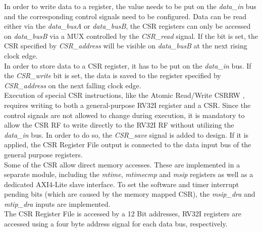 In order to write data to a register, the value needs to be put on the \textit{data\_in} bus and the corresponding control signals need to be configured. Data can be read either via the \textit{data\_busA} or \textit{data\_busB}, the CSR registers can only be accessed on \textit{data\_busB} via a MUX controlled by the \textit{CSR\_read} signal. If the bit is set, the CSR specified by \textit{CSR\_address} will be visible on \textit{data\_busB} at the next rising clock edge.\\
In order to store data to a CSR register, it has to be put on the \textit{data\_in} bus. If the \textit{CSR\_write} bit is set, the data is saved to the register specified by \textit{CSR\_address} on the next falling clock edge.\\
Execution of special \ac{CSR} instructions, like the Atomic Read/Write CSRRW \cite{riscv:unprivileged}, requires writing to both a general-purpose RV32I register and a \ac{CSR}. Since the control signals are not allowed to change during execution, it is mandatory to allow the \ac{CSR} \ac{RF} to write directly to the \ac{RV32I} \ac{RF} without utilizing the \textit{data\_in} bus.
In order to do so, the \textit{CSR\_save} signal is added to design. 
If it is applied, the \ac{CSR} Register File output is connected to the data input bus of the general purpose registers.  \\
Some of the \ac{CSR} allow direct memory accesses. These are implemented in a separate module, including the \textit{mtime}, \textit{mtimecmp} and \textit{msip} registers as well as a dedicated AXI4-Lite slave interface. To set the software and timer interrupt pending bits (which are caused by the memory mapped \ac{CSR}), the \textit{msip\_dra} and \textit{mtip\_dra} inputs are implemented.\\
The \ac{CSR} Register File is accessed by a 12 Bit addresses, \ac{RV32I} registers are accessed using a four byte address signal for each data bus, respectively.   

